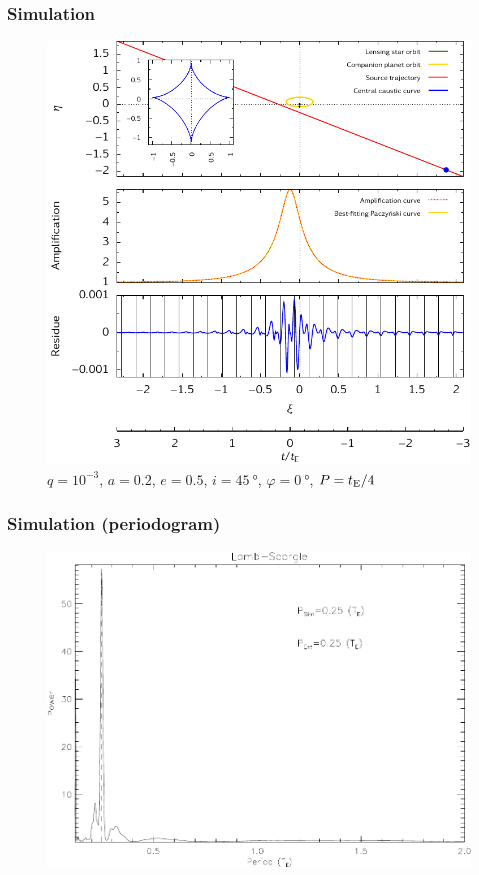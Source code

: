 \documentclass[10pt]{beamer}
\renewcommand{\phi}{\varphi}
\begin{document}
\begin{frame}
  \frametitle{Simulation}
  \begin{figure}
    \centering
    \vspace{-0.5em}
    \includegraphics[width=0.6\columnwidth]{figures/figure2}
    \caption{\(q = 10^{-3}\), \(a = 0.2\), \(e = 0.5\), \(i =
      \SI{45}{\degree}\), \(\phi = \SI{0}{\degree}\), \(P = t_{\textup{E}}/4\)}
    \vspace{-1.2em}
  \end{figure}
\end{frame}

\begin{frame}
  \frametitle{Simulation (periodogram)}
  \begin{figure}
    \centering
    \includegraphics[width=0.85\columnwidth]{figures/lombscargle2}
  \end{figure}
\end{frame}
\end{document}
